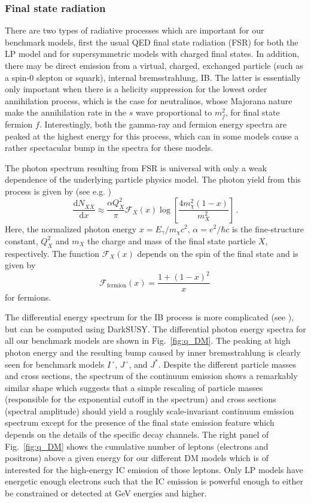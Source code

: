 \documentclass[10pt,aps,pra,reprint,amsmath,amsfonts,amssymb,showpacs,nofootinbib,floatfix]{revtex4-1}
\newcommand{\rmn}{\mathrm}
\newcommand{\dd}{\rmn{d}}
\newcommand{\eg}{E_\gamma}
\begin{document}
\subsubsection{Final state radiation}
There are two types of radiative processes which are important for our
benchmark models, first the usual QED final state radiation (FSR) for
both the LP model and for supersymmetric models with charged final
states. In addition, there may be direct emission from a virtual,
charged, exchanged particle (such as a spin-0 slepton or squark),
internal bremsstrahlung, IB. The latter is essentially only important
when there is a helicity suppression for the lowest order annihilation
process, which is the case for neutralinos, whose Majorana nature make
the annihilation rate in the $s$ wave proportional to $m_f^2$, for
final state fermion $f$. Interestingly, both the gamma-ray and fermion
energy spectra are peaked at the highest energy for this process,
which can in some models cause a rather spectacular bump in the
spectra for these models.

The photon spectrum resulting from FSR is universal with only a
weak dependence of the underlying particle physics model. The photon
yield from this process is given by (see
e.g. \cite{2008JHEP...01..049B})
\begin{equation}
\frac{\dd N_{X \bar{X}}}{\dd x} \approx \frac{\alpha Q_X^2}{\pi}
\mathcal{F}_X(x) \log\left[\frac{4 m_\chi^2\left(1-x\right)}{m_X^2}\right]\,.
\end{equation}
Here, the normalized photon energy $x=\eg/m_\chi c^2$, 
$\alpha =e^2/\hbar c$ is the fine-structure constant, 
$Q_X^2$ and $m_X$ the
charge and mass of the final state particle $X$, respectively. The function
$\mathcal{F}_X(x)$ depends on the spin of the final state and is given
by
\begin{equation}
\mathcal{F}_\rmn{fermion}(x) = \frac{1+\left(1-x\right)^2}{x}\,
\end{equation}
for fermions. 

The differential energy spectrum for the IB process is more
complicated (see \cite{1989PhLB..225..372B,2008JHEP...01..049B}), but
can be computed using {\sc DarkSUSY}. The differential photon energy
spectra for all our benchmark models are shown in Fig.~\ref{fig:q_DM}.
The peaking at high photon energy and the resulting bump caused by
inner bremsstrahlung is clearly seen for benchmark models $I´$, $J´$,
and $J^*$. Despite the different particle masses and cross sections,
the spectrum of the continuum emission shows a remarkably similar
shape which suggests that a simple rescaling of particle masses
(responsible for the exponential cutoff in the spectrum) and cross
sections (spectral amplitude) should yield a roughly scale-invariant
continuum emission spectrum except for the presence of the final state
emission feature which depends on the details of the specific decay
channels. The right panel of Fig.~\ref{fig:q_DM} shows the cumulative
number of leptons (electrons and positrons) above a given energy for
our different DM models which is of interested for the high-energy IC
emission of those leptons. Only LP models have energetic enough
electrons such that the IC emission is powerful enough to either be
constrained or detected at GeV energies and higher.
\end{document}
